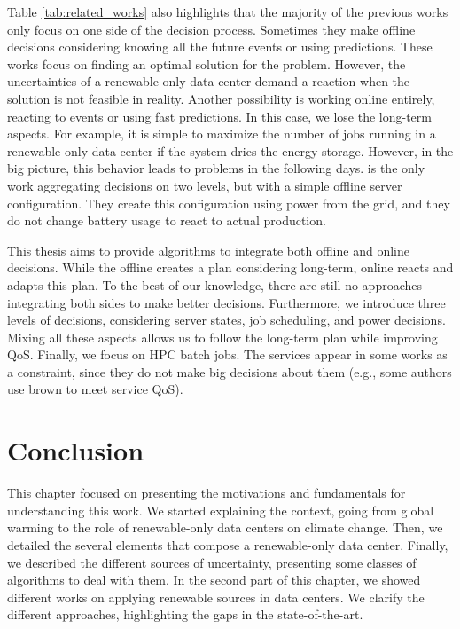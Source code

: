 Table \ref{tab:related_works} also highlights that the majority of the previous works only focus on one side of the decision process. Sometimes they make offline decisions considering knowing all the future events or using predictions. These works focus on finding an optimal solution for the problem. However, the uncertainties of a renewable-only data center demand a reaction when the solution is not feasible in reality. Another possibility is working online entirely, reacting to events or using fast predictions. In this case, we lose the long-term aspects. For example, it is simple to maximize the number of jobs running in a renewable-only data center if the system dries the energy storage. However, in the big picture, this behavior leads to problems in the following days. \cite{venkataswamy2023rare} is the only work aggregating decisions on two levels, but with a simple offline server configuration. They create this configuration using power from the grid, and they do not change battery usage to react to actual production.

This thesis aims to provide algorithms to integrate both offline and online decisions. While the offline creates a plan considering long-term, online reacts and adapts this plan. To the best of our knowledge, there are still no approaches integrating both sides to make better decisions. Furthermore, we introduce three levels of decisions, considering server states, job scheduling, and power decisions. Mixing all these aspects allows us to follow the long-term plan while improving QoS. Finally, we focus on HPC batch jobs. The services appear in some works as a constraint, since they do not make big decisions about them (e.g., some authors use brown to meet service QoS).



\section{Conclusion}

This chapter focused on presenting the motivations and fundamentals for understanding this work. We started explaining the context, going from global warming to the role of renewable-only data centers on climate change. Then, we detailed the several elements that compose a renewable-only data center. Finally, we described the different sources of uncertainty, presenting some classes of algorithms to deal with them. In the second part of this chapter, we showed different works on applying renewable sources in data centers. We clarify the different approaches, highlighting the gaps in the state-of-the-art.